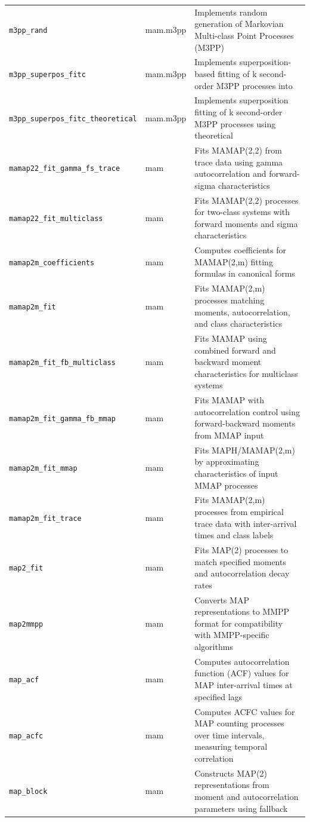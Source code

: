 \begin{footnotesize}
\begin{longtable}{|p{0.4\linewidth}|p{0.1\linewidth}|p{0.5\linewidth}|}
\texttt{m3pp\_rand} & mam.m3pp & Implements random generation of Markovian Multi-class Point Processes (M3PP)\\
\texttt{m3pp\_superpos\_fitc} & mam.m3pp & Implements superposition-based fitting of k second-order M3PP processes into\\
\texttt{m3pp\_superpos\_fitc\_theoretical} & mam.m3pp & Implements superposition fitting of k second-order M3PP processes using theoretical\\
\texttt{mamap22\_fit\_gamma\_fs\_trace} & mam & Fits MAMAP(2,2) from trace data using gamma autocorrelation and forward-sigma characteristics\\
\texttt{mamap22\_fit\_multiclass} & mam & Fits MAMAP(2,2) processes for two-class systems with forward moments and sigma characteristics\\
\texttt{mamap2m\_coefficients} & mam & Computes coefficients for MAMAP(2,m) fitting formulas in canonical forms\\
\texttt{mamap2m\_fit} & mam & Fits MAMAP(2,m) processes matching moments, autocorrelation, and class characteristics\\
\texttt{mamap2m\_fit\_fb\_multiclass} & mam & Fits MAMAP using combined forward and backward moment characteristics for multiclass systems\\
\texttt{mamap2m\_fit\_gamma\_fb\_mmap} & mam & Fits MAMAP with autocorrelation control using forward-backward moments from MMAP input\\
\texttt{mamap2m\_fit\_mmap} & mam & Fits MAPH/MAMAP(2,m) by approximating characteristics of input MMAP processes\\
\texttt{mamap2m\_fit\_trace} & mam & Fits MAMAP(2,m) processes from empirical trace data with inter-arrival times and class labels\\
\texttt{map2\_fit} & mam & Fits MAP(2) processes to match specified moments and autocorrelation decay rates\\
\texttt{map2mmpp} & mam & Converts MAP representations to MMPP format for compatibility with MMPP-specific algorithms\\
\texttt{map\_acf} & mam & Computes autocorrelation function (ACF) values for MAP inter-arrival times at specified lags\\
\texttt{map\_acfc} & mam & Computes ACFC values for MAP counting processes over time intervals, measuring temporal correlation\\
\texttt{map\_block} & mam & Constructs MAP(2) representations from moment and autocorrelation parameters using fallback\\

\end{longtable}
\end{footnotesize}
